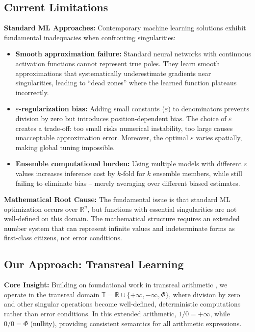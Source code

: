 \documentclass[twoside,11pt]{article}
\newcommand{\TR}{\mathbb{T}}
\newcommand{\RR}{\mathbb{R}}
\begin{document}
\subsection{Current Limitations}
\textbf{Standard ML Approaches:} Contemporary machine learning solutions exhibit fundamental inadequacies when confronting singularities:
\begin{itemize}
\item \textbf{Smooth approximation failure:} Standard neural networks with continuous activation functions cannot represent true poles. They learn smooth approximations that systematically underestimate gradients near singularities, leading to ``dead zones'' where the learned function plateaus incorrectly.
\item \textbf{$\varepsilon$-regularization bias:} Adding small constants ($\varepsilon$) to denominators prevents division by zero but introduces position-dependent bias. The choice of $\varepsilon$ creates a trade-off: too small risks numerical instability, too large causes unacceptable approximation error. Moreover, the optimal $\varepsilon$ varies spatially, making global tuning impossible.
\item \textbf{Ensemble computational burden:} Using multiple models with different $\varepsilon$ values increases inference cost by $k$-fold for $k$ ensemble members, while still failing to eliminate bias -- merely averaging over different biased estimates.
\end{itemize}

\textbf{Mathematical Root Cause:} The fundamental issue is that standard ML optimization occurs over $\mathbb{R}^n$, but functions with essential singularities are not well-defined on this domain. The mathematical structure requires an extended number system that can represent infinite values and indeterminate forms as first-class citizens, not error conditions.
\subsection{Our Approach: Transreal Learning}
\textbf{Core Insight:} Building on foundational work in transreal arithmetic \citep{anderson2006perspex,reis2016transreal}, we operate in the transreal domain $\TR = \RR \cup \{+\infty, -\infty, \Phi\}$, where division by zero and other singular operations become well-defined, deterministic computations rather than error conditions. In this extended arithmetic, $1/0 = +\infty$, while $0/0 = \Phi$ (nullity), providing consistent semantics for all arithmetic expressions.
\end{document}
